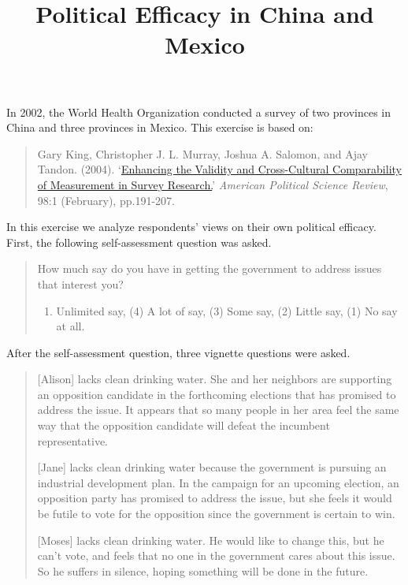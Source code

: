 \documentclass[]{article}
\title{Political Efficacy in China and Mexico}
\author{}
\date{}
\begin{document}
\maketitle


In 2002, the World Health Organization conducted a survey of two
provinces in China and three provinces in Mexico. This exercise is based
on:

\begin{quote}
Gary King, Christopher J. L. Murray, Joshua A. Salomon, and Ajay Tandon.
(2004). `\href{https://doi.org/10.1017/S000305540400108X}{Enhancing the
Validity and Cross-Cultural Comparability of Measurement in Survey
Research.}' \emph{American Political Science Review}, 98:1 (February),
pp.191-207.
\end{quote}

In this exercise we analyze respondents' views on their own political
efficacy. First, the following self-assessment question was asked.

\begin{quote}
How much say do you have in getting the government to address issues
that interest you?

\begin{enumerate}
\def\labelenumi{(\arabic{enumi})}
\setcounter{enumi}{4}
\itemsep1pt\parskip0pt
\item
  Unlimited say, (4) A lot of say, (3) Some say, (2) Little say, (1) No
  say at all.
\end{enumerate}
\end{quote}

After the self-assessment question, three vignette questions were asked.

\begin{quote}
{[}Alison{]} lacks clean drinking water. She and her neighbors are
supporting an opposition candidate in the forthcoming elections that has
promised to address the issue. It appears that so many people in her
area feel the same way that the opposition candidate will defeat the
incumbent representative.

{[}Jane{]} lacks clean drinking water because the government is pursuing
an industrial development plan. In the campaign for an upcoming
election, an opposition party has promised to address the issue, but she
feels it would be futile to vote for the opposition since the government
is certain to win.

{[}Moses{]} lacks clean drinking water. He would like to change this,
but he can't vote, and feels that no one in the government cares about
this issue. So he suffers in silence, hoping something will be done in
the future.
\end{quote}
\end{document}
